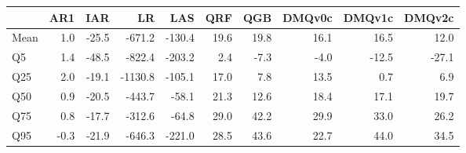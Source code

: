 \begin{tabular}{lrrrrrrrrr}
\toprule
 & AR1 & IAR & LR & LAS & QRF & QGB & DMQv0c & DMQv1c & DMQv2c \\
\midrule
Mean & 1.0 & -25.5 & -671.2 & -130.4 & 19.6 & 19.8 & 16.1 & 16.5 & 12.0 \\
Q5 & 1.4 & -48.5 & -822.4 & -203.2 & 2.4 & -7.3 & -4.0 & -12.5 & -27.1 \\
Q25 & 2.0 & -19.1 & -1130.8 & -105.1 & 17.0 & 7.8 & 13.5 & 0.7 & 6.9 \\
Q50 & 0.9 & -20.5 & -443.7 & -58.1 & 21.3 & 12.6 & 18.4 & 17.1 & 19.7 \\
Q75 & 0.8 & -17.7 & -312.6 & -64.8 & 29.0 & 42.2 & 29.9 & 33.0 & 26.2 \\
Q95 & -0.3 & -21.9 & -646.3 & -221.0 & 28.5 & 43.6 & 22.7 & 44.0 & 34.5 \\
\bottomrule
\end{tabular}
